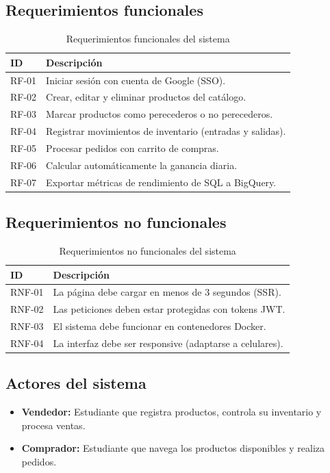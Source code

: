 \documentclass[12pt, a4paper]{article}
\begin{document}
\subsection{Requerimientos funcionales}
\begin{table}[H]
\centering
\caption{Requerimientos funcionales del sistema}
\label{tab:req_funcionales}
\begin{tabular}{@{}ll@{}}
\toprule
\textbf{ID} & \textbf{Descripción} \\ \midrule
RF-01 & Iniciar sesión con cuenta de Google (SSO). \\
RF-02 & Crear, editar y eliminar productos del catálogo. \\
RF-03 & Marcar productos como perecederos o no perecederos. \\
RF-04 & Registrar movimientos de inventario (entradas y salidas). \\
RF-05 & Procesar pedidos con carrito de compras. \\
RF-06 & Calcular automáticamente la ganancia diaria. \\
RF-07 & Exportar métricas de rendimiento de SQL a BigQuery. \\ \bottomrule
\end{tabular}
\end{table}

\subsection{Requerimientos no funcionales}
\begin{table}[H]
\centering
\caption{Requerimientos no funcionales del sistema}
\label{tab:req_no_funcionales}
\begin{tabular}{@{}ll@{}}
\toprule
\textbf{ID} & \textbf{Descripción} \\ \midrule
RNF-01 & La página debe cargar en menos de 3 segundos (SSR). \\
RNF-02 & Las peticiones deben estar protegidas con tokens JWT. \\
RNF-03 & El sistema debe funcionar en contenedores Docker. \\
RNF-04 & La interfaz debe ser responsive (adaptarse a celulares). \\ \bottomrule
\end{tabular}
\end{table}

\subsection{Actores del sistema}
\begin{itemize}
    \item \textbf{Vendedor:} Estudiante que registra productos, controla su inventario y procesa ventas.
    \item \textbf{Comprador:} Estudiante que navega los productos disponibles y realiza pedidos.
\end{itemize}
\end{document}
